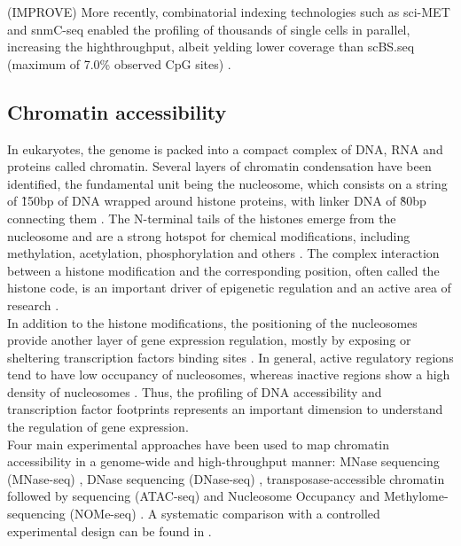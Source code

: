 (IMPROVE) More recently, combinatorial indexing technologies such as sci-MET \cite{Mulqueen2018} and snmC-seq \cite{Luo2018} enabled the profiling of thousands of single cells in parallel, increasing the highthroughput, albeit yelding lower coverage than scBS.seq (maximum of 7.0\% observed CpG sites) \cite{Mulqueen2018}.



\subsection{Chromatin accessibility}
In eukaryotes, the genome is packed into a compact complex of DNA, RNA and proteins called chromatin. Several layers of chromatin condensation have been identified, the fundamental unit being the nucleosome, which consists on a string of \~150bp of DNA wrapped around histone proteins, with linker DNA of \~80bp connecting them \cite{Klemm2019,Tsompana2014}. The N-terminal tails of the histones emerge from the nucleosome and are a strong hotspot for chemical modifications, including methylation, acetylation, phosphorylation and others \cite{Bannister2011}. The complex interaction between a histone modification and the corresponding position, often called the histone code, is an important driver of epigenetic regulation and an active area of research \cite{Zhao2015}. \\
In addition to the histone modifications, the positioning of the nucleosomes provide another layer of gene expression regulation, mostly by exposing or sheltering transcription factors binding sites \cite{Jiang2009}. In general, active regulatory regions tend to have low occupancy of nucleosomes, whereas inactive regions show a high density of nucleosomes \cite{Struhl2013}. Thus, the profiling of DNA accessibility and transcription factor footprints represents an important dimension to understand the regulation of gene expression.\\

Four main experimental approaches have been used to map chromatin accessibility in a genome-wide and high-throughput manner: MNase sequencing (MNase-seq) \cite{Kaplan2008}, DNase sequencing (DNase-seq) \cite{Song2010}, transposase-accessible chromatin followed by sequencing (ATAC-seq) \cite{Buenrostro2013} and Nucleosome Occupancy and Methylome-sequencing (NOMe-seq) \cite{Kelly2012}. A systematic comparison with a controlled experimental design can be found in \cite{Nordstrom2019}.

